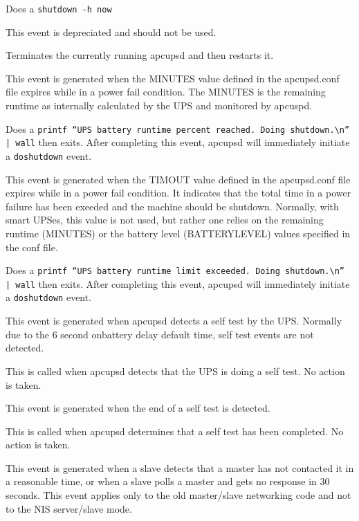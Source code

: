 {{{{{{\begin{description}
Does a {\tt shutdown -h now}  

\item [restartme]
   This event is depreciated and should not be used.  

Terminates the currently running apcupsd and then restarts it.  

\item [runlimit]
   This event is generated when the MINUTES value defined in the apcupsd.conf
file expires while in a power fail condition. The MINUTES is the remaining
runtime as internally calculated by the UPS and monitored by apcuspd.  

Does a {\tt printf ``UPS battery runtime percent reached. Doing
shutdown.\textbackslash{}n'' | wall} then exits.  After completing this event,
apcupsd will immediately initiate a {\tt doshutdown} event.  

\item [timeout]
   This event is generated when the TIMOUT value defined in the apcupsd.conf file
expires while in a power fail condition. It indicates that the total time in a
power failure has been exeeded and the machine should be shutdown. Normally,
with smart UPSes, this value is not used, but rather one relies on the
remaining runtime (MINUTES) or the battery level (BATTERYLEVEL) values
specified in the conf file.  

Does a {\tt printf ``UPS battery runtime limit exceeded. Doing
shutdown.\textbackslash{}n'' | wall} then exits. After completing this event,
apcupsd will immediately initiate a {\tt doshutdown} event.  

\item [startselftest]
   This event is generated when apcupsd detects a self test by the UPS. Normally
due to the 6 second onbattery delay default time, self test events are not
detected.  

This is called when apcupsd detects that the UPS is doing a self test. No
action is taken.  

\item [endselftest]
   This event is generated when the end of a self test is detected.  

This is called when apcupsd determines that a self test has been completed. No
action is taken.  

\item [mastertimeout]
   This event is generated when a slave detects that a master has not contacted
it in a reasonable time, or when a slave polls a master and gets no response
in 30 seconds. This event applies only to the old master/slave networking code
and not to the NIS server/slave mode.  


\end{description}}}}}}}
